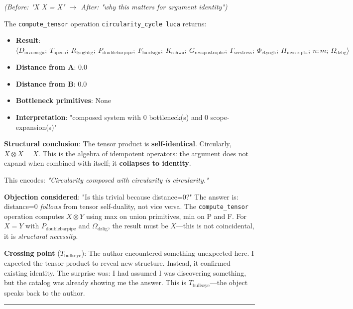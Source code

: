 \documentclass[12pt,a4paper]{article}
\begin{document}
\emph{(Before: "X \otimes X = X" $\rightarrow$ After: "why this matters for argument identity")}

The \texttt{compute\_tensor} operation \texttt{circularity\_cycle \otimes luca} returns:

\begin{itemize}
    \item \textbf{Result}: $\langle D_{\text{invomega}};\ T_{\text{openo}};\ R_{\text{lyoghlig}};\ P_{\text{doublebarpipe}};\ F_{\text{hardsign}};\ K_{\text{schwa}};\ G_{\text{revapostrophe}};\ \Gamma_{\text{secstress}};\ \Phi_{\text{ctyogh}};\ H_{\text{invscripta}};\ n{:}m;\ \Omega_{\text{dzlig}} \rangle$
    \item \textbf{Distance from A}: 0.0
    \item \textbf{Distance from B}: 0.0
    \item \textbf{Bottleneck primitives}: None
    \item \textbf{Interpretation}: "composed system with 0 bottleneck(s) and 0 scope-expansion(s)"
\end{itemize}

\textbf{Structural conclusion}: The tensor product is \textbf{self-identical}. Circularly, $X \otimes X = X$. This is the algebra of idempotent operators: the argument does not expand when combined with itself; it \textbf{collapses to identity}.

This encodes: \emph{"Circularity composed with circularity is circularity."}

\textbf{Objection considered}: "Is this trivial because distance=0?" The answer is: distance=0 \emph{follows} from tensor self-duality, not vice versa. The \texttt{compute\_tensor} operation computes $X \otimes Y$ using max on union primitives, min on P and F. For $X=Y$ with $P_{\text{doublebarpipe}}$ and $\Omega_{\text{dzlig}}$, the result must be $X$---this is not coincidental, it is \emph{structural necessity}.

\textbf{Crossing point} ($T_{\text{bullseye}}$): The author encountered something unexpected here. I expected the tensor product to reveal new structure. Instead, it confirmed existing identity. The surprise was: I had assumed I was discovering something, but the catalog was already showing me the answer. This is $T_{\text{bullseye}}$---the object speaks back to the author.

\begin{center}
\rule{0.5\textwidth}{0.4pt}
\end{center}
\end{document}
